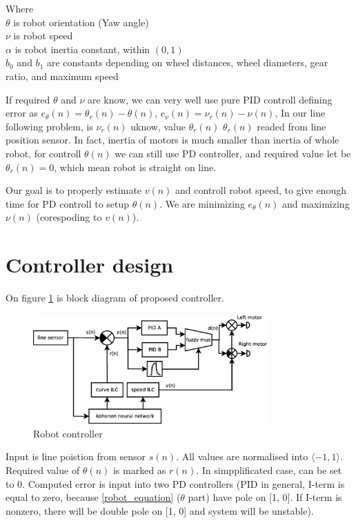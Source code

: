 \documentclass[twoside]{oss-conf-eng}
\begin{document}
Where \\
$\theta$ is robot orientation (Yaw angle) \\
$\nu$ is robot speed \\
$\alpha$ is robot inertia constant, within $(0, 1)$ \\
$b_0$ and $b_1$ are constants depending on wheel distances, wheel diameters, gear ratio, and
maximum speed

If required $\theta$ and $\nu$ are know, we can very well use pure PID controll defining error
as $e_{\theta}(n) = \theta_r(n) - \theta(n)$, $e_{\nu}(n) = \nu_r(n) - \nu(n)$,
In our line following problem, is $\nu_r(n)$ uknow, value $\theta_r(n)$ $\theta_r(n)$ readed from
line position sensor. In fact, inertia of motors is much
smaller than inertia of whole robot, for controll $\theta(n)$ we can still use PD
controller, and required value let be $\theta_r(n) = 0$, which mean robot is straight on line.

Our goal is to properly estimate $v(n)$ and controll robot speed, to give enough time
for PD controll to setup $\theta(n)$. We are minimizing $e_{\theta}(n)$ and maximizing $\nu(n)$
(corespoding to $v(n)$).


\section{Controller design}

On figure \ref{fig:robot_controller} is block diagram of proposed controller.

\begin{figure}[]
    \centering
    \includegraphics[width=0.8\textwidth]{block_diagram/robot_block.eps}
    \caption{Robot controller}
    \label{fig:robot_controller}
\end{figure}

Input is line poistion from sensor $s(n)$. All values are normalised into
$\langle -1, 1 \rangle$.
Required value of $\theta(n)$ is marked as
$r(n)$. In simpplificated case, can be set to 0. Computed error is input into two
PD controllers (PID in general, I-term is equal to zero, because \ref{robot_equation}
($\theta$ part) have pole on [1, 0]. If I-term is nonzero, there will be double pole on [1, 0] and
system will be unstable).
\end{document}
